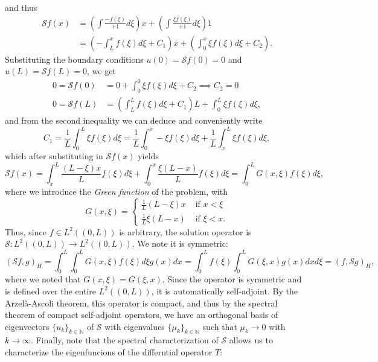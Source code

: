 and thus 
\begin{align*}
    \mathcal{S}f(x) &= \left(\int\frac{-f(\xi)}{+1}d\xi\right)x + \left(\int\frac{\xi f(\xi)}{+1}d\xi\right)1\\
    &= \left(-\int_L^x f(\xi)d\xi + C_1\right)x + \left(\int_0^x \xi f(\xi)d\xi + C_2\right).
\end{align*}
Substituting the boundary conditions $u(0)=\mathcal{S}f(0)=0$ and $u(L)=\mathcal{S}f(L)=0$, we get
\begin{align*}
    0 = \mathcal{S}f(0) &= 0 + \int_0^0 \xi f(\xi)d\xi + C_2 \implies C_2 = 0\\
    0 = \mathcal{S}f(L) &= \left(\int_L^L f(\xi)d\xi + C_1\right)L + \int_0^L \xi f(\xi)d\xi,
\end{align*}
and from the second inequality we can deduce and conveniently write
\begin{equation*}
    C_1 = \frac{1}{L}\int_0^L \xi f(\xi)d\xi = \frac{1}{L}\int_0^x -\xi f(\xi)d\xi + \frac{1}{L} \int_x^L \xi f(\xi)d\xi,
\end{equation*}
which after substituting in $\mathcal{S}f(x)$ yields
\begin{equation*}
    \mathcal{S}f(x) = \int_x^L \frac{(L-\xi)x}{L}f(\xi)d\xi + \int_0^x \frac{\xi(L-x)}{L}f(\xi)d\xi = \int_0^L G(x,\xi) f(\xi)d\xi,
\end{equation*}
where we introduce the \textit{Green function} of the problem, with 
\begin{equation*}
    G(x,\xi) = \begin{cases}
        \frac{1}{L}(L-\xi)x &\text{ if }x<\xi\\
        \frac{1}{L}\xi(L-x) &\text{ if }\xi<x.
    \end{cases}
\end{equation*}
Thus, since $f\in L^2((0,L))$ is arbitrary, the solution operator is $\mathcal{S}:L^2((0,L))\to L^2((0,L))$. We note it is symmetric: 
\begin{equation*}
    (\mathcal{S}f,g)_H = \int_0^L \int_0^L G(x,\xi)f(\xi)d\xi g(x)dx = \int_0^L f(\xi) \int_0^L G(\xi, x) g(x)dxd\xi = (f, \mathcal{S}g)_H,
\end{equation*}
where we noted that $G(x,\xi)=G(\xi,x)$. Since the operator is symmetric and is defined over the entire $L^2((0,L))$, it is automatically self-adjoint. By the Arzelà-Ascoli theorem, this operator is compact, and thus by the spectral theorem of compact self-adjoint operators, we have an orthogonal basis of eigenvectors $\{u_k\}_{k\in\mathbb{N}}$ of $\mathcal{S}$ with eigenvalues $\{\mu_k\}_{k\in \mathbb{N}}$ such that $\mu_k\to 0$ with $k\to\infty$. Finally, note that the spectral characterization of $\mathcal{S}$ allows us to characterize the eigenfuncions of the differntial operator $T$:
